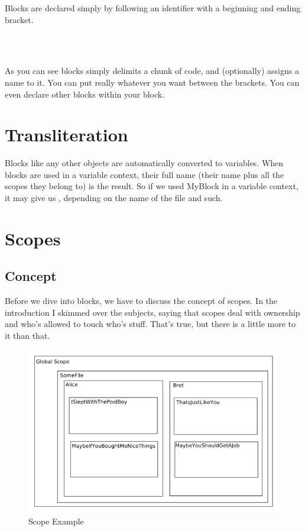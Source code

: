 Blocks are declared simply by following an identifier with a beginning and ending bracket.

\begin{SSCodeBox}
\scitea{\{} \\
\scitea{\hspace*{4em}}
\scitea{} \\
\scitea{\}}
\end{SSCodeBox}

As you can see blocks simply delimits a chunk of code, and (optionally) assigns a name to it.  You can put really whatever you want between the brackets.  You can even declare other blocks within your block.  

\section{Transliteration}

Blocks like any other objects are automatically converted to variables.  When blocks are used in a variable context, their full name (their name plus all the scopes they belong to) is the result.  So if we used MyBlock in a variable context, it may give us , depending on the name of the file and such.

\section{Scopes}
\subsection{Concept}

Before we dive into blocks, we have to discuss the concept of scopes.  In the introduction I skimmed over the subjects, saying that scopes deal with ownership and who's allowed to touch who's stuff.  That's true, but there is a little more to it than that.

\begin{figure}[h]
\centering
\includegraphics[width=\linewidth]{graphics/ScopeExample}
\caption{Scope Example}
\end{figure}

